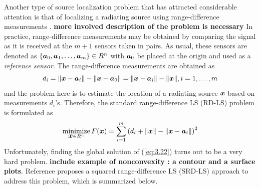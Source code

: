 Another type of source localization problem that has attracted considerable attention is that of localizing a radiating source using range-difference measurements \cite{ StLi, BeckStLi}. \textbf{more involved description of the problem is necessary} In practice, range-difference measurements may be
obtained by comparing the signal as it is received at the $m+1$ sensors taken in pairs. As usual, these sensors are denoted as $\{\mbox{\boldmath$a$}_0, \mbox{\boldmath$a$}_1,\ldots,\mbox{\boldmath$a$}_m\} \in R^n$ with $\mbox{\boldmath$a$}_0$ be placed at the origin and used as a \textit{reference sensor}.  The range-difference measurements are obtained as
 \begin{equation} \label{eq:3.21}
 d_i=\|\mbox{\boldmath$x$}-\mbox{\boldmath$a$}_i\|-\|\mbox{\boldmath$x$}-\mbox{\boldmath$a$}_0\|=\|\mbox{\boldmath$x$}-\mbox{\boldmath$a$}_i\|-\|\mbox{\boldmath$x$}\|, i = 1,\ldots,m
 \end{equation}
and the problem here is to estimate the location of a radiating source $\mbox{\boldmath$x$}$ based on measurements $d_i$'s. Therefore, the standard range-difference LS (RD-LS) problem is formulated as
 \begin{equation} \label{eq:3.22}
\mathop{\mbox{minimize}}_{\mbox{\boldmath$x$} \in R^n} F(\mbox{\boldmath$x$})=\sum_{i=1}^m \left(d_i+\|\mbox{\boldmath$x$}\|-\|\mbox{\boldmath$x$}-\mbox{\boldmath$a$}_i\|\right)^2
 \end{equation}
 Unfortunately, finding the global solution of (\ref{eq:3.22}) turns out to be a very hard problem. \textbf{include example of nonconvexity : a contour and a surface plots}. Reference \cite{BeckStLi} proposes a squared range-difference LS (SRD-LS) approach to address this problem, which is summarized below.

